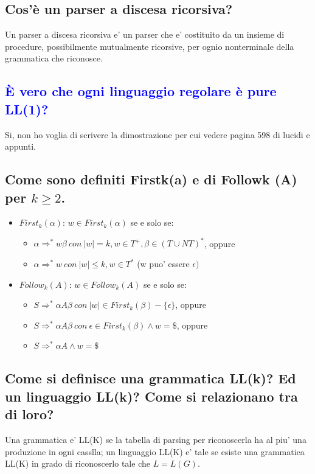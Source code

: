 \documentclass{article}
\begin{document}
\subsection{Cos'è un parser a discesa ricorsiva?}
Un parser a discesa ricorsiva e' un parser che e' costituito da un insieme di
procedure, possibilmente mutualmente ricorsive, per ognio nonterminale della
grammatica che riconosce.
\subsection{\textcolor{blue}{È vero che ogni linguaggio regolare è pure LL(1)?}}
Si, non ho voglia di scrivere la dimostrazione per cui vedere pagina 598 di
lucidi e appunti.
\subsection{Come sono definiti Firstk(a) e di Followk (A) per $k\ge2$.}
\begin{itemize}
    \item $First_k(\alpha)$: $w\in First_k(\alpha)$ se e solo se:
          \begin{itemize}
              \item $\alpha\Rightarrow^*w\beta\ con\ |w|=k, w \in T^+, \beta\in(T\cup NT)^*$, oppure
              \item $\alpha \Rightarrow^*w\ con\ |w|\leq k, w\in T^*$ (w puo' essere $\epsilon)$
          \end{itemize}
    \item $Follow_k(A)$: $w\in Follow_k(A)$ se e solo se:
          \begin{itemize}
              \item $S\Rightarrow^*\alpha A\beta\ con\ |w|\in First_k(\beta)-\{\epsilon\}$, oppure
              \item $S\Rightarrow^*\alpha A\beta\ con\ \epsilon\in First_k(\beta)\land w=\$ $, oppure
              \item $S\Rightarrow^*\alpha A \land w=\$ $
          \end{itemize}
\end{itemize}
\subsection{Come si definisce una grammatica LL(k)? Ed un linguaggio LL(k)? Come si relazionano tra di loro?}
Una grammatica e' LL(K) se la tabella di parsing per riconoscerla ha al piu'
una produzione in ogni casslla; un linguaggio LL(K) e' tale se esiste una
grammatica LL(K) in grado di riconoscerlo tale che $L=L(G)$.
\end{document}
